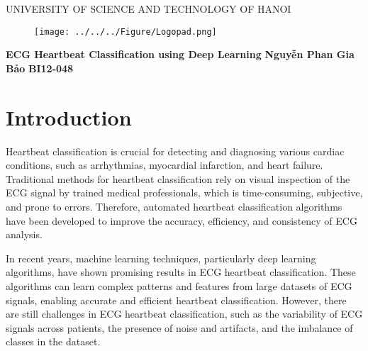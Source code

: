 \documentclass[14pt]{extreport}
\begin{document}
\begin{titlepage}
    \begin{center}
        \begin{adjustwidth}{-100pt}{-100pt}
            \centering
            {\fontsize{20}{15}\selectfont UNIVERSITY OF SCIENCE AND TECHNOLOGY OF HANOI}
            \vspace{1cm}
            \begin{figure}[ht]
                \texttt{[image: ../../../Figure/Logopad.png]}
            \end{figure}
            \vspace{2cm}

        \end{adjustwidth}
        \textbf{\LARGE ECG Heartbeat Classification using Deep Learning}
        \newline
        \vspace{4cm}
        \textbf{\Large Nguyễn Phan Gia Bảo}
        \newline
        \textbf{\Large BI12-048}
        \date{}
    \end{center}
\end{titlepage}


\begingroup\singlespacing
\tableofcontents
\endgroup
\clearpage


\chapter{Introduction}

Heartbeat classification is crucial for detecting and diagnosing various cardiac conditions, such as arrhythmias, myocardial infarction, and heart failure. Traditional methods for heartbeat classification rely on visual inspection of the ECG signal by trained medical professionals, which is time-consuming, subjective, and prone to errors. Therefore, automated heartbeat classification algorithms have been developed to improve the accuracy, efficiency, and consistency of ECG analysis.

In recent years, machine learning techniques, particularly deep learning algorithms, have shown promising results in ECG heartbeat classification. These algorithms can learn complex patterns and features from large datasets of ECG signals, enabling accurate and efficient heartbeat classification. However, there are still challenges in ECG heartbeat classification, such as the variability of ECG signals across patients, the presence of noise and artifacts, and the imbalance of classes in the dataset.
\end{document}
